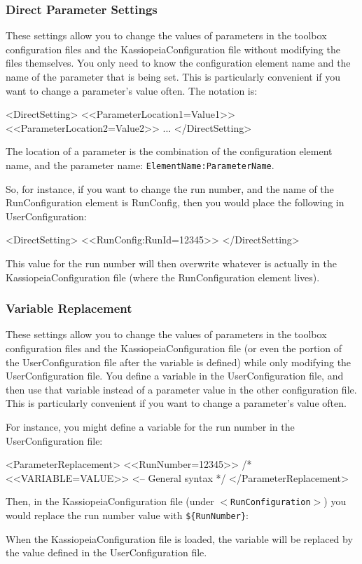 \subsubsection{Direct Parameter Settings}
These settings allow you to change the values of parameters in the toolbox configuration files and the KassiopeiaConfiguration file without modifying the files themselves.  You only need to know the configuration element name and the name of the parameter that is being set.  This is particularly convenient if you want to change a parameter's value often.  The notation is:
\begin{DoxyCode}
<DirectSetting>
    <<ParameterLocation1=Value1>>
    <<ParameterLocation2=Value2>>
    ...
</DirectSetting>
\end{DoxyCode}
The location of a parameter is the combination of the configuration element name, and the parameter name: \texttt{ElementName:ParameterName}.

So, for instance, if you want to change the run number, and the name of the RunConfiguration element is RunConfig, then you would place the following in UserConfiguration:
\begin{DoxyCode}
<DirectSetting>
    <<RunConfig:RunId=12345>>
</DirectSetting>
\end{DoxyCode}
This value for the run number will then overwrite whatever is actually in the KassiopeiaConfiguration file (where the RunConfiguration element lives).

\subsubsection{Variable Replacement}
These settings allow you to change the values of parameters in the toolbox configuration files and the KassiopeiaConfiguration file (or even the portion of the UserConfiguration file after the variable is defined) while only modifying the UserConfiguration file.  You define a variable in the UserConfiguration file, and then use that variable instead of a parameter value in the other configuration file.  This is particularly convenient if you want to change a parameter's value often.

For instance, you might define a variable for the run number in the UserConfiguration file:
\begin{DoxyCode}
<ParameterReplacement>
    <<RunNumber=12345>>
    /* <<VARIABLE=VALUE>> <-- General syntax */
</ParameterReplacement>
\end{DoxyCode}
Then, in the KassiopeiaConfiguration file (under \texttt{$<$RunConfiguration$>$}) you would replace the run number value with \texttt{\$\{RunNumber\}}:
When the KassiopeiaConfiguration file is loaded, the variable will be replaced by the value defined in the UserConfiguration file.

